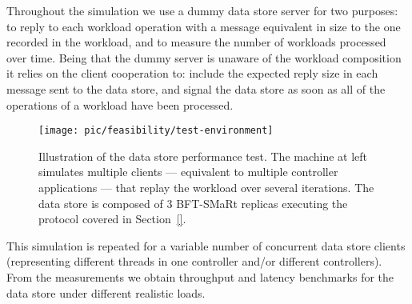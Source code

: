 Throughout the simulation we use a dummy data store server for two purposes: to reply to each workload operation with a message equivalent in size to the one  recorded in the workload, and to measure the number of workloads processed over time. 
Being that the dummy server is unaware of the workload composition it relies on the client cooperation to: include the expected reply size in each message sent to the data store, and signal the data store as soon as all of the operations of a workload have been processed. 



\begin{figure}
  \centering
  \texttt{[image: pic/feasibility/test-environment]}   
  \caption{Illustration of the data store performance test. The machine at left simulates multiple clients --- equivalent to multiple controller applications --- that replay the workload over several iterations. The data store is composed of 3 BFT-SMaRt replicas executing the protocol covered in Section~\ref{}.} 
  \label{fig:feasibility:simulation}
\end{figure}


This simulation is repeated for a variable number of concurrent data store clients (representing different threads in one controller and/or different controllers). 
From the measurements we obtain throughput and latency benchmarks for the data store under different realistic loads. 


